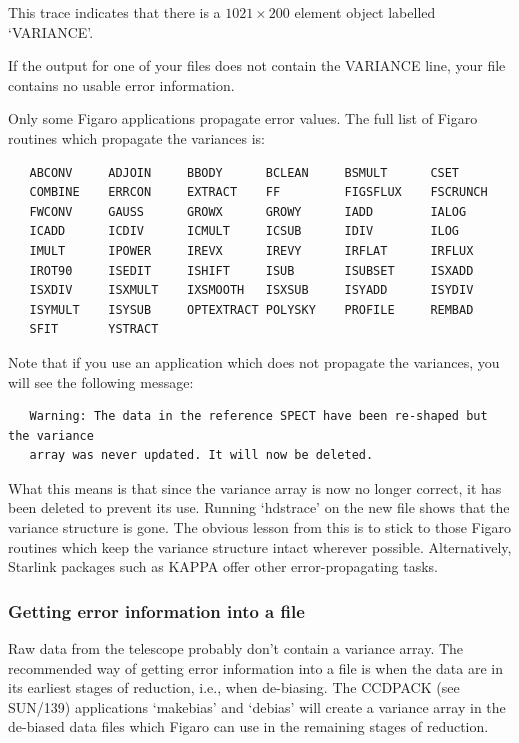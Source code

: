 \documentclass[11pt,twoside]{article}
\newcommand{\xref}[3]{#1}
\newcommand{\latorhtm}[2]{#1}
\newcommand{\latorhtm}[2]{#2}
\begin{document}
This trace indicates that there is a \latorhtm{$1021\times 200$}{1021x200}
element object labelled `VARIANCE'.

If the output for one of your files does not contain the VARIANCE line,
your file contains no usable error information.

Only some Figaro applications propagate error values.  The full list of
Figaro routines which propagate the variances is:

\begin{verbatim}
   ABCONV     ADJOIN     BBODY      BCLEAN     BSMULT      CSET
   COMBINE    ERRCON     EXTRACT    FF         FIGSFLUX    FSCRUNCH
   FWCONV     GAUSS      GROWX      GROWY      IADD        IALOG
   ICADD      ICDIV      ICMULT     ICSUB      IDIV        ILOG
   IMULT      IPOWER     IREVX      IREVY      IRFLAT      IRFLUX
   IROT90     ISEDIT     ISHIFT     ISUB       ISUBSET     ISXADD
   ISXDIV     ISXMULT    IXSMOOTH   ISXSUB     ISYADD      ISYDIV
   ISYMULT    ISYSUB     OPTEXTRACT POLYSKY    PROFILE     REMBAD
   SFIT       YSTRACT
\end{verbatim}

Note that if you use an application which does not propagate the
variances, you will see the following message:

{\small
\begin{verbatim}
   Warning: The data in the reference SPECT have been re-shaped but the variance
   array was never updated. It will now be deleted.
\end{verbatim}
}

What this means is that since the variance array is now no longer correct,
it has been deleted to prevent its use.
Running `hdstrace' on the new file shows that the variance structure is gone.
The obvious lesson from this is to stick to those Figaro
routines which keep the
variance structure intact wherever possible. Alternatively, Starlink
packages such as KAPPA offer other error-propagating tasks.

\subsubsection{Getting error information into a file}

Raw data from the telescope probably don't contain a variance array.
The recommended way of getting error information into a file is when the
data are in its earliest stages of reduction, i.e., when de-biasing. The
CCDPACK (see \xref{SUN/139}{sun139}{}) applications
`\xref{makebias}{sun139}{MAKEBIAS}' and `\xref{debias}{sun139}{DEBIAS}'
will create a variance array in the de-biased data files which Figaro can
use in the remaining stages of reduction.
\end{document}
